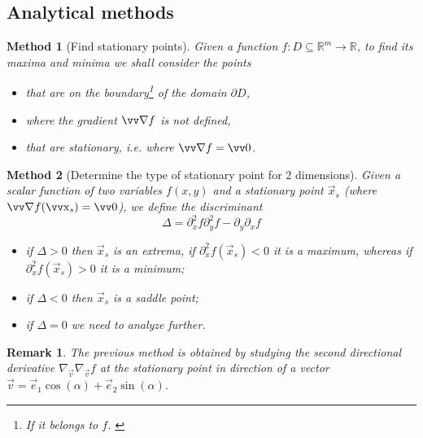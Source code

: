 \documentclass[twocolumn, margin=small]{tex/hsrzf}
\theoremstyle{fuvarzf}
\newtheorem{method}{Method}
\newtheorem{remark}{Remark}
\begin{document}
\subsection{Analytical methods}

\begin{method}[Find stationary points]
  Given a function \(f: D \subseteq \mathbb{R}^m \to \mathbb{R}\), to
  find its maxima and minima we shall consider the points
  \begin{itemize}
    \item that are on the boundary\footnote{If it belongs to \(f\).
      \label{ftn:boundary}} of the domain \(\partial D\),
    \item where the gradient \(\grad f\) is not defined,
    \item that are stationary, i.e. where \(\grad f = \vec{0}\).
  \end{itemize}
\end{method}

\begin{method}[Determine the type of stationary point for 2 dimensions]
  Given a scalar function of two variables \(f(x,y)\) and a stationary point
  \(\vec{x}_s\) (where \(\grad f(\vec{x}_s) = \vec{0}\)), we define the
  \emph{discriminant}
  \[
    \Delta = \partial_x^2 f \partial_y^2 f - \partial_y \partial_x f
  \]
  \begin{itemize}
    \item if \(\Delta > 0\) then \(\vec{x}_s\) is an extrema, if \(\partial_x^2
      f(\vec{x}_s) < 0\) it is a maximum, whereas if \(\partial_x^2
      f(\vec{x}_s) > 0\) it is a minimum;

    \item if \(\Delta < 0\) then \(\vec{x}_s\) is a saddle point;

    \item if \(\Delta = 0\) we need to analyze further.
  \end{itemize}
\end{method}

\begin{remark}
  The previous method is obtained by studying the second directional derivative
  \(\nabla_\vec{v}\nabla_\vec{v} f\) at the stationary point in direction of a
  vector \(\vec{v} = \vec{e}_1\cos(\alpha) + \vec{e}_2\sin(\alpha)\).
\end{remark}
\end{document}
